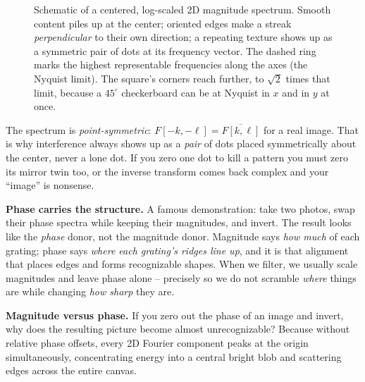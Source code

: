 \begin{figure}[H]
\caption{Schematic of a centered, log-scaled 2D magnitude spectrum. Smooth
content piles up at the center; oriented edges make a streak \emph{perpendicular}
to their own direction; a repeating texture shows up as a symmetric pair of dots
at its frequency vector. The dashed ring marks the highest representable
frequencies along the axes (the Nyquist limit). The square's corners reach
further, to $\sqrt{2}$ times that limit, because a $45^\circ$ checkerboard can be at
Nyquist in $x$ and in $y$ at once.}
\label{ch31:fig-spectrum}
\end{figure}

\begin{trapbox}
The spectrum is \emph{point-symmetric}: $F[-k,-\ell] = \overline{F[k,\ell]}$ for a
real image. That is why interference always shows up as a \emph{pair} of dots
placed symmetrically about the center, never a lone dot. If you zero one dot to
kill a pattern you must zero its mirror twin too, or the inverse transform comes
back complex and your ``image'' is nonsense.
\end{trapbox}

\begin{whybox}
\textbf{Phase carries the structure.} A famous demonstration: take two photos,
swap their phase spectra while keeping their magnitudes, and invert. The result
looks like the \emph{phase} donor, not the magnitude donor. Magnitude says
\emph{how much} of each grating; phase says \emph{where each grating's ridges
line up}, and it is that alignment that places edges and forms recognizable shapes.
When we filter, we usually scale magnitudes and leave phase alone -- precisely so we
do not scramble \emph{where} things are while changing \emph{how sharp} they are.
\end{whybox}

\begin{recoverybox}
\textbf{Magnitude versus phase.} If you zero out the phase of an
image and invert, why does the resulting picture become almost unrecognizable?
Because without relative phase offsets, every 2D Fourier component peaks at the origin
simultaneously, concentrating energy into a central bright blob and scattering edges
across the entire canvas.
\end{recoverybox}

